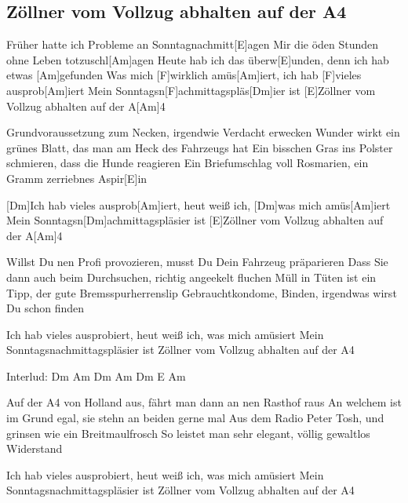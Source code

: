 \subsection*{Zöllner vom Vollzug abhalten auf der A4   }
\begin{guitar}
[Am]Früher hatte ich Probleme an Sonntagnachmitt[E]agen
Mir die öden Stunden ohne Leben totzuschl[Am]agen
Heute hab ich das überw[E]unden, denn ich hab etwas [Am]gefunden
Was mich [F]wirklich amüs[Am]iert, ich hab [F]vieles ausprob[Am]iert
Mein Sonntagsn[F]achmittagspläs[Dm]ier ist [E]Zöllner vom Vollzug abhalten auf der A[Am]4

 

Grundvoraussetzung zum Necken, irgendwie Verdacht erwecken
Wunder wirkt ein grünes Blatt, das man am Heck des Fahrzeugs hat
Ein bisschen Gras ins Polster schmieren, dass die Hunde reagieren
Ein Briefumschlag voll Rosmarien, ein Gramm zerriebnes Aspir[E]in

[Dm]Ich hab vieles ausprob[Am]iert, heut weiß ich, [Dm]was mich amüs[Am]iert
Mein Sonntagsn[Dm]achmittagspläsier ist  [E]Zöllner vom Vollzug abhalten auf der A[Am]4

 

Willst Du nen Profi provozieren, musst Du Dein Fahrzeug präparieren
Dass Sie dann auch beim Durchsuchen, richtig angeekelt fluchen
Müll in Tüten ist ein Tipp, der gute Bremsspurherrenslip
Gebrauchtkondome, Binden, irgendwas wirst Du schon finden

Ich hab vieles ausprobiert, heut weiß ich, was mich amüsiert
Mein Sonntagsnachmittagspläsier ist Zöllner vom Vollzug abhalten auf der A4

 

Interlud: Dm Am Dm Am Dm E Am

 

Auf der A4 von Holland aus, fährt man dann an nen Rasthof raus
An welchem ist im Grund egal, sie stehn an beiden gerne mal
Aus dem Radio Peter Tosh, und grinsen wie ein Breitmaulfrosch
So leistet man sehr elegant, völlig gewaltlos Widerstand

Ich hab vieles ausprobiert, heut weiß ich, was mich amüsiert
Mein Sonntagsnachmittagspläsier ist Zöllner vom Vollzug abhalten auf der A4
\end{guitar}
